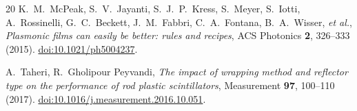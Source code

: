 \documentclass[11pt,a4paper]{article}
\begin{document}
\begin{thebibliography}{20}
K.~M.~McPeak, S.~V.~Jayanti, S.~J.~P.~Kress, S.~Meyer, S.~Iotti, A.~Rossinelli,
G.~C.~Beckett, J.~M.~Fabbri, C.~A.~Fontana, B.~A.~Wisser, \emph{et al.},
\emph{Plasmonic films can easily be better: rules and recipes},
ACS Photonics \textbf{2}, 326--333 (2015).
\href{https://doi.org/10.1021/ph5004237}{doi:10.1021/ph5004237}.

A.~Taheri, R.~Gholipour Peyvandi,
\emph{The impact of wrapping method and reflector type on the performance of rod
plastic scintillators},
Measurement \textbf{97}, 100--110 (2017).
\href{https://doi.org/10.1016/j.measurement.2016.10.051}{doi:10.1016/j.measurement.2016.10.051}.

\end{thebibliography}
\end{document}
